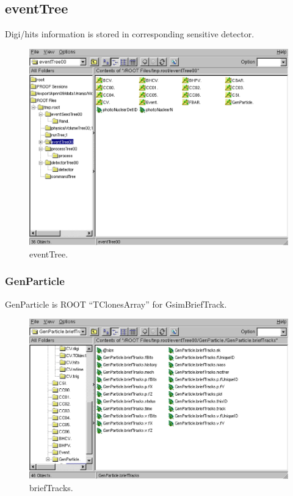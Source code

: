 \documentclass[a4paper,12pt]{article}
\begin{document}
  \subsection{eventTree}
  Digi/hits information is stored in corresponding sensitive detector.
   \begin{figure}[H]
    \begin{center}
     \includegraphics[scale=0.5]{xwd/et.eps}
    \end{center}
    \caption{eventTree.}
   \end{figure}

   \subsubsection{GenParticle}
   GenParticle is ROOT ``TClonesArray'' for GsimBriefTrack.
   \begin{figure}[H]
    \begin{center}
     \includegraphics[scale=0.5]{xwd/bt.eps}
    \end{center}
    \caption{briefTracks.}
   \end{figure}
\end{document}

